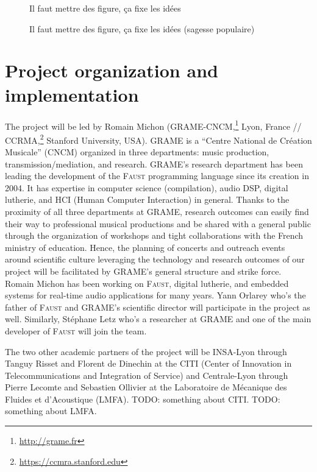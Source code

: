 \documentclass[a4paper,10pt]{article}
\newcommand{\F}{\textsc{Faust}}
\newcommand{\PP}{our project}
\begin{document}

\begin{figure}[h]
  \centerline{Il faut mettre des figure, ça fixe les idées}
    \caption{Il faut mettre des figure, ça fixe les idées (sagesse populaire)}
\label{fig1}
\end{figure}
\section{Project organization and implementation}

The project will be led by Romain Michon (GRAME-CNCM,\footnote{\url{http://grame.fr}} Lyon, France // CCRMA,\footnote{\url{https://ccmra.stanford.edu}} Stanford University, USA). GRAME is a ``Centre National de Création Musicale'' (CNCM) organized in three departments: music production, transmission/mediation, and research. GRAME's research department has been leading the development of the \F{} programming language since its creation in 2004. It has expertise in computer science (compilation), audio DSP, digital lutherie, and HCI (Human Computer Interaction) in general. Thanks to the proximity of all three departments at GRAME, research outcomes can easily find their way to professional musical productions and be shared with a general public through the organization of workshops and tight collaborations with the French ministry of education. Hence, the planning of concerts and outreach events around scientific culture leveraging the technology and research outcomes of \PP{} will be facilitated by GRAME's general structure and strike force. Romain Michon has been working on \F{}, digital lutherie, and embedded systems for real-time audio applications for many years. Yann Orlarey who's the father of \F{} and GRAME's scientific director will participate in the project as well. Similarly, Stéphane Letz who's a researcher at GRAME and one of the main developer of \F{} will join the team. 

The two other academic partners of the project will be INSA-Lyon through Tanguy Risset and Florent de Dinechin at the CITI (Center of Innovation in Telecommunications and Integration of Service) and Centrale-Lyon through Pierre Lecomte and Sebastien Ollivier at the Laboratoire de Mécanique des Fluides et d'Acoustique (LMFA). TODO: something about CITI. TODO: something about LMFA.
\end{document}
